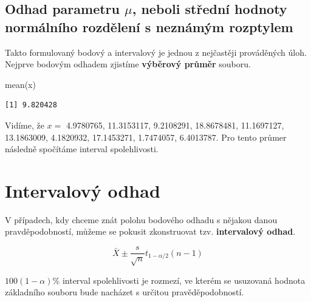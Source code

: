 \documentclass[
  letterpaper,
  DIV=11,
  numbers=noendperiod]{scrreprt}
\newenvironment{Shaded}{\begin{snugshade}}{\end{snugshade}}
\newcommand{\FunctionTok}[1]{\textcolor[rgb]{0.28,0.35,0.67}{#1}}
\newcommand{\NormalTok}[1]{\textcolor[rgb]{0.00,0.23,0.31}{#1}}
\begin{document}
\hypertarget{odhad-parametru-mu-neboli-stux159ednuxed-hodnoty-normuxe1lnuxedho-rozdux11blenuxed-s-neznuxe1muxfdm-rozptylem}{%
\subsection{\texorpdfstring{Odhad parametru \(\mu\), neboli střední
hodnoty normálního rozdělení s neznámým
rozptylem}{Odhad parametru \textbackslash mu, neboli střední hodnoty normálního rozdělení s neznámým rozptylem}}\label{odhad-parametru-mu-neboli-stux159ednuxed-hodnoty-normuxe1lnuxedho-rozdux11blenuxed-s-neznuxe1muxfdm-rozptylem}}

Takto formulovaný bodový a intervalový je jednou z nejčastěji
prováděných úloh. Nejprve bodovým odhadem zjistíme \textbf{výběrový
průměr} souboru.

\begin{Shaded}
\begin{Highlighting}[]
\FunctionTok{mean}\NormalTok{(x)}
\end{Highlighting}
\end{Shaded}

\begin{verbatim}
[1] 9.820428
\end{verbatim}

Vidíme, že \(x =\) 4.9780765, 11.3153117, 9.2108291, 18.8678481,
11.1697127, 13.1863009, 4.1820932, 17.1453271, 1.7474057, 6.4013787. Pro
tento průmer následně spočítáme interval spolehlivosti.

\hypertarget{intervalovuxfd-odhad}{%
\section{Intervalový odhad}\label{intervalovuxfd-odhad}}

V případech, kdy chceme znát polohu bodového odhadu s nějakou danou
pravděpodobností, můžeme se pokusit zkonstruovat tzv.
\textbf{intervalový odhad}.

\[
\bar{X} \pm \dfrac{s}{\sqrt{n}}t_{1-\alpha/2}(n-1)
\]

\(100(1-\alpha)\%\) interval spolehlivosti je rozmezí, ve kterém se
usuzovaná hodnota základního souboru bude nacházet s určitou
pravěděpodobností.
\end{document}
